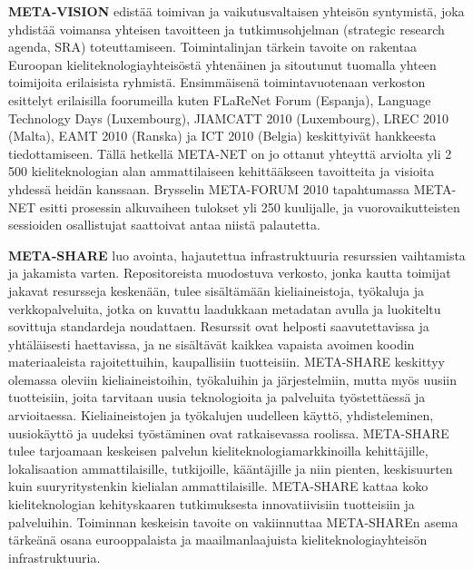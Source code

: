 \documentclass[]{../../metanetpaper}
\begin{document}
\begin{multicols}{2}

\textbf{META-VISION} edistää toimivan ja vaikutusvaltaisen yhteisön
syntymistä, joka yhdistää voimansa yhteisen tavoitteen ja
tutkimusohjelman (strategic research agenda, SRA)
toteuttamiseen. Toimintalinjan tärkein tavoite on rakentaa Euroopan
kieliteknologiayhteisöstä yhtenäinen ja sitoutunut tuomalla yhteen
toimijoita erilaisista ryhmistä. Ensimmäisenä toimintavuotenaan
verkoston esittelyt erilaisilla foorumeilla kuten FLaReNet Forum
(Espanja), Language Technology Days (Luxembourg), JIAMCATT 2010
(Luxembourg), LREC 2010 (Malta), EAMT 2010 (Ranska) ja ICT 2010
(Belgia) keskittyivät hankkeesta tiedottamiseen.  Tällä hetkellä
META-NET on jo ottanut yhteyttä arviolta yli 2 500 kieliteknologian
alan ammattilaiseen kehittääkseen tavoitteita ja visioita yhdessä
heidän kanssaan. Brysselin META-FORUM 2010 tapahtumassa META-NET
esitti prosessin alkuvaiheen tulokset yli 250 kuulijalle, ja
vuorovaikutteisten sessioiden osallistujat saattoivat antaa niistä
palautetta.

\textbf{META-SHARE} luo avointa, hajautettua infrastruktuuria
resurssien vaihtamista ja jakamista varten. Repositoreista muodostuva
verkosto, jonka kautta toimijat jakavat resursseja keskenään, tulee
sisältämään kieliaineistoja, työkaluja ja verkkopalveluita, jotka on
kuvattu laadukkaan metadatan avulla ja luokiteltu sovittuja
standardeja noudattaen. Resurssit ovat helposti saavutettavissa ja
yhtäläisesti haettavissa, ja ne sisältävät kaikkea vapaista avoimen
koodin materiaaleista rajoitettuihin, kaupallisiin
tuotteisiin. META-SHARE keskittyy olemassa oleviin kieliaineistoihin,
työkaluihin ja järjestelmiin, mutta myös uusiin tuotteisiin, joita
tarvitaan uusia teknologioita ja palveluita työstettäessä ja
arvioitaessa. Kieliaineistojen ja työkalujen uudelleen käyttö,
yhdisteleminen, uusiokäyttö ja uudeksi työstäminen ovat ratkaisevassa
roolissa.  META-SHARE tulee tarjoamaan keskeisen palvelun
kieliteknologiamarkkinoilla kehittäjille, lokalisaation
ammattilaisille, tutkijoille, kääntäjille ja niin pienten,
keskisuurten kuin suuryritystenkin kielialan ammattilaisille.
META-SHARE kattaa koko kieliteknologian kehityskaaren tutkimuksesta
innovatiivisiin tuotteisiin ja palveluihin. Toiminnan keskeisin
tavoite on vakiinnuttaa META-SHAREn asema tärkeänä osana
eurooppalaista ja maailmanlaajuista kieliteknologiayhteisön
infrastruktuuria.


\end{multicols}
\end{document}
